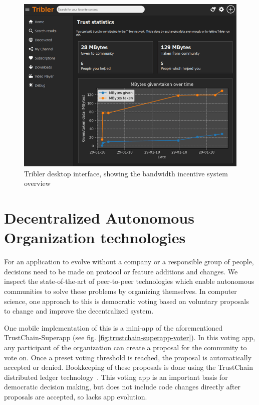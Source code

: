 \begin{figure}
        \includegraphics[width=1\linewidth]{related-work/tribler7.3.0.png}
        \caption{Tribler desktop interface, showing the bandwidth incentive system overview}
        \label{fig:tribler}
    \endminipage
\end{figure}

\section{Decentralized Autonomous Organization technologies}
For an application to evolve without a company or a responsible group of people, decisions need to be made on protocol or feature additions and changes. We inspect the state-of-the-art of peer-to-peer technologies which enable autonomous communities to solve these problems by organizing themselves. In computer science, one approach to this is democratic voting based on voluntary proposals to change and improve the decentralized system. 

One mobile implementation of this is a mini-app of the aforementioned TrustChain-Superapp (see fig. \ref{fig:trustchain-superapp-voter}). In this voting app, any participant of the organization can create a proposal for the community to vote on. Once a preset voting threshold is reached, the proposal is automatically accepted or denied. Bookkeeping of these proposals is done using the TrustChain distributed ledger technology~\citep{otte2017trustchain}. This voting app is an important basis for democratic decision making, but does not include code changes directly after proposals are accepted, so lacks app evolution. 

